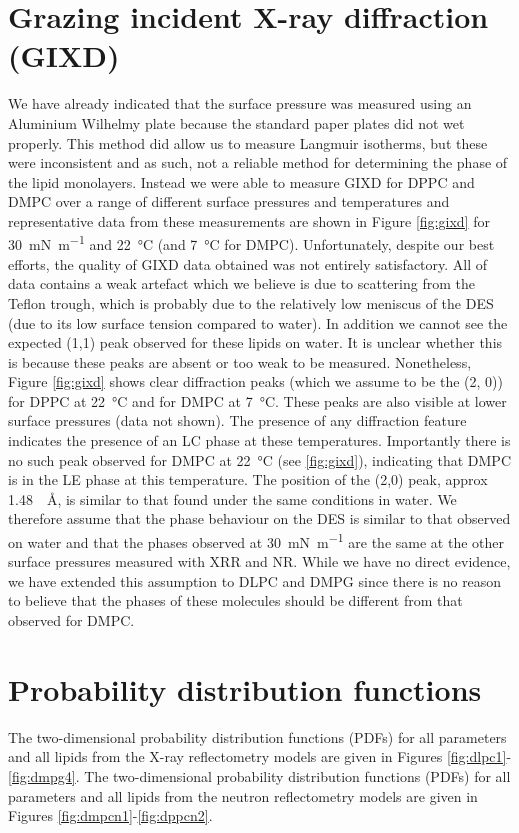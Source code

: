 \documentclass[amsmath,amssymb,superscriptaddress]{revtex4-1}
\begin{document}
\section{Grazing incident X-ray diffraction (GIXD)}
\label{sec:gixd}
We have already indicated that the surface pressure was measured using an Aluminium Wilhelmy plate because the standard paper plates did not wet properly. This method did allow us to measure Langmuir isotherms, but these were inconsistent and as such, not a reliable method for determining the phase of the lipid monolayers.
Instead we were able to measure GIXD for DPPC and DMPC over a range of different surface pressures and temperatures and representative data from these measurements are shown in Figure \ref{fig:gixd} for \SI{30}{\milli\newton\per\meter} and \SI{22}{\celsius} (and \SI{7}{\celsius} for DMPC).
Unfortunately, despite our best efforts, the quality of GIXD data obtained was not entirely satisfactory.
All of data contains a weak artefact which we believe is due to scattering from the Teflon trough, which is probably due to the relatively low meniscus of the DES (due to its low surface tension compared to water). In addition we cannot see the expected (1,1) peak observed for these lipids on water.
It is unclear whether this is because these peaks are absent or too weak to be measured.
Nonetheless, Figure \ref{fig:gixd} shows clear diffraction peaks (which we assume to be the (2, 0)) for DPPC at \SI{22}{\celsius} and for DMPC at \SI{7}{\celsius}.
These peaks are also visible at lower surface pressures (data not shown).
The presence of any diffraction feature indicates the presence of an LC phase at these temperatures.
Importantly there is no such peak observed for DMPC at \SI{22}{\celsius} (see \ref{fig:gixd}), indicating that DMPC is in the LE phase at this temperature.
The position of the (2,0) peak, approx \SI{1.48}{\per\angstrom}, is similar to that found under the same conditions in water.\cite{Watkins2009}
We therefore assume that the phase behaviour on the DES is similar to that observed on water and that the phases observed at \SI{30}{\milli\newton\per\meter} are the same at the other surface pressures measured with XRR and NR.
While we have no direct evidence, we have extended this assumption to DLPC and DMPG since there is no reason to believe that the phases of these molecules should be different from that observed for DMPC.

\section{Probability distribution functions}
The two-dimensional probability distribution functions (PDFs) for all parameters and all lipids from the X-ray reflectometry models are given in Figures \ref{fig:dlpc1}-\ref{fig:dmpg4}.
The two-dimensional probability distribution functions (PDFs) for all parameters and all lipids from the neutron reflectometry models are given in Figures \ref{fig:dmpcn1}-\ref{fig:dppcn2}.
\end{document}
